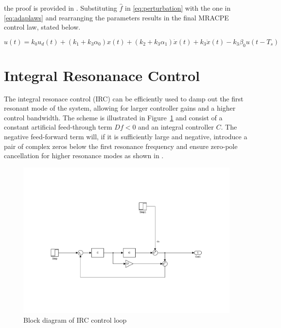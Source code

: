 the proof is provided in \citep{Qingson:2016}. Substituting $\hat{f}$ in \eqref{eq:perturbation} with the one in \eqref{eq:adaplaws} and rearranging the parameters results in the final MRACPE control law, stated below.

\begin{equation}
    \label{eq:adaplawsfinal}
  u(t) = k_0u_d(t) + (k_1 + k_3\alpha_0)x(t) +  (k_2 + k_3\alpha_1)\dot{x}(t) + k_3\ddot{x}(t) - k_3\beta_0u(t-T_s)
\end{equation}


\section{Integral Resonanace Control}
The integral resonace control (IRC) can be efficiently used to damp out the first resonant mode of the system, allowing for larger controller gains and a higher control bandwidth. The \abbrIRC scheme is illustrated in Figure~\ref{fig:irc} and consist of a constant artificial feed-through term $Df<0$ and an integral controller $C$. The negative feed-forward term will, if it is sufficiently large and negative, introduce a pair of complex zeros below the first resonance frequency and ensure zero-pole cancellation for higher resonance modes as shown in \citep{Aphale:2007}.

\begin{figure}[h]
  \centering %
  \includegraphics[width=1\textwidth, trim=5.5cm 3cm 5.1cm 9.5cm, clip=true]{fig/matlab/irc}
  \caption{\label{fig:irc}Block diagram of IRC control loop}
\end{figure}

